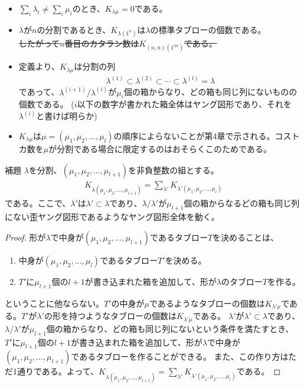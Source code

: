 \documentclass[a4paper,11pt]{jsarticle}
\theoremstyle{plain}
\theoremstyle{definition}
\renewcommand{\(}{\left(}
\renewcommand{\)}{\right)}
\renewcommand{\[}{\left[}
\renewcommand{\]}{\right]}
\renewcommand{\{}{\left\lbrace}
\renewcommand{\}}{\right\rbrace}
\begin{document}
\begin{itemize}
    \item $\sum_{i} \lambda_i \neq \sum_{i} \mu_i$のとき、$K_{\lambda \mu} = 0$である。
    \item $\lambda$が$n$の分割であるとき、$K_{\lambda (1^n)}$は$\lambda$の標準タブローの個数である。\\
    \sout{したがって$n$番目のカタラン数は$K_{(n,n) (1^{2n})}$である。}
    \item 定義より、$K_{\lambda \mu}$は分割の列
    \begin{align*}
        \lambda^{(1)} \subset \lambda^{(2)} \subset \cdots \subset \lambda^{(l)} = \lambda
    \end{align*}
    であって、$\lambda^{(i+1)}/\lambda^{(i)}$が$\mu_i$個の箱からなり、どの箱も同じ列にないものの個数である。
    ($i$以下の数字が書かれた箱全体はヤング図形であり、それを$\lambda^{(i)}$と書けば明らか)
    \item $K_{\lambda \mu}$は$\mu = (\mu_1, \mu_2, \ldots, \mu_l)$の順序によらないことが第4章で示される。コストカ数を$\mu$が分割である場合に限定するのはおそらくこのためである。
\end{itemize}

\begin{itembox}[l]{補題}
    $\lambda$を分割、$(\mu_1, \mu_2, \ldots, \mu_{l+1})$を非負整数の組とする。
    \begin{align*}
        K_{\lambda (\mu_1, \mu_2, \ldots, \mu_{l+1})} = \sum_{\lambda'} K_{\lambda' (\mu_1, \mu_2, \ldots, \mu_{l})}
    \end{align*}
    である。ここで、$\lambda'$は$\lambda' \subset \lambda$であり、$\lambda / \lambda'$が$\mu_{l+1}$個の箱からなるどの箱も同じ列にない歪ヤング図形であるようなヤング図形全体を動く。
\end{itembox}

\begin{proof}
    形が$\lambda$で中身が$(\mu_1, \mu_2, \ldots, \mu_{l+1})$であるタブロー$T$を決めることは、
    \begin{enumerate}
        \item 中身が$(\mu_1, \mu_2, \ldots, \mu_{l})$であるタブロー$T'$を決める。
        \item $T'$に$\mu_{l+1}$個の$l+1$が書き込まれた箱を追加して、形が$\lambda$のタブロー$T$を作る。
    \end{enumerate}
    ということに他ならない。$T'$の中身が$\mu$であるようなタブローの個数は$K_{\lambda' \mu}$である。$T'$が$\lambda'$の形を持つようなタブローの個数は$K_{\lambda' \mu}$である。
    $\lambda'$が$\lambda' \subset \lambda$であり、$\lambda / \lambda'$が$\mu_{l+1}$個の箱からなり、どの箱も同じ列にないという条件を満たすとき、
    $T'$に$\mu_{l+1}$個の$l+1$が書き込まれた箱を追加して、形が$\lambda$で中身が$(\mu_1, \mu_2, \ldots, \mu_{l+1})$であるタブローを作ることができる。
    また、この作り方はただ1通りである。よって、$K_{\lambda (\mu_1, \mu_2, \ldots, \mu_{l+1})} = \sum_{\lambda'} K_{\lambda' (\mu_1, \mu_2, \ldots, \mu_{l})}$である。
\end{proof}
\end{document}

